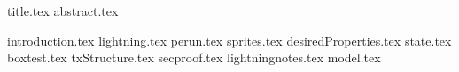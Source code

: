 \documentclass[11pt]{llncs}
\begin{document}
{title.tex}
\thispagestyle{plain}
{abstract.tex}

{introduction.tex}
{lightning.tex}
{perun.tex}
{sprites.tex}
{desiredProperties.tex}
{state.tex}
{boxtest.tex}
{txStructure.tex}
{secproof.tex}
{lightningnotes.tex}
{model.tex}

\end{document}
